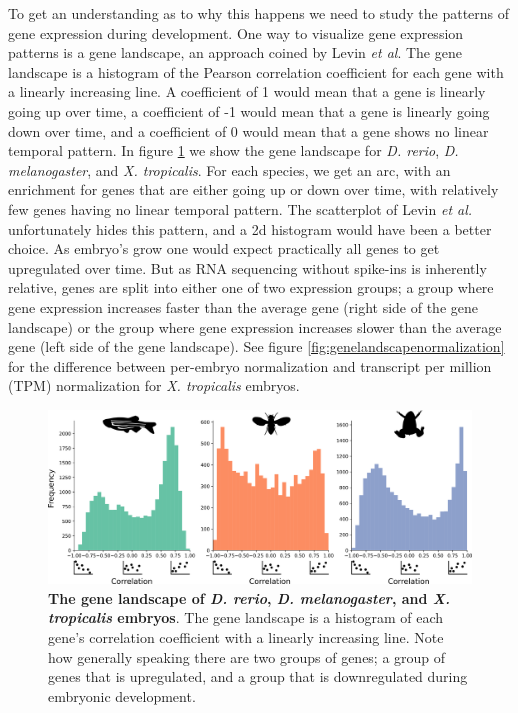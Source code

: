 To get an understanding as to why this happens we need to study the patterns of gene expression during development. One way to visualize gene expression patterns is a gene landscape, an approach coined by Levin \textit{et al}. The gene landscape is a histogram of the Pearson correlation coefficient for each gene with a linearly increasing line. A coefficient of 1 would mean that a gene is linearly going up over time, a coefficient of -1 would mean that a gene is linearly going down over time, and a coefficient of 0 would mean that a gene shows no linear temporal pattern. In figure \ref{fig:genelandscape} we show the gene landscape for \textit{D. rerio}, \textit{D. melanogaster}, and \textit{X. tropicalis}. For each species, we get an arc, with an enrichment for genes that are either going up or down over time, with relatively few genes having no linear temporal pattern. The scatterplot of Levin \textit{et al.} unfortunately hides this pattern, and a 2d histogram would have been a better choice. As embryo's grow one would expect practically all genes to get upregulated over time. But as RNA sequencing without spike-ins is inherently relative, genes are split into either one of two expression groups; a group where gene expression increases faster than the average gene (right side of the gene landscape) or the group where gene expression increases slower than the average gene (left side of the gene landscape). See figure \ref{fig:genelandscapenormalization} for the difference between per-embryo normalization and transcript per million (TPM) normalization for \textit{X. tropicalis} embryos.

\begin{figure}[H]
    \includegraphics[width=\linewidth]{ch.hourglass/images/gene_landscape.png}
    \caption{\textbf{The gene landscape of \textit{D. rerio}, \textit{D. melanogaster}, and \textit{X. tropicalis} embryos}. The gene landscape is a histogram of each gene's correlation coefficient with a linearly increasing line. Note how generally speaking there are two groups of genes; a group of genes that is upregulated, and a group that is downregulated during embryonic development.}
    \label{fig:genelandscape}
\end{figure}

